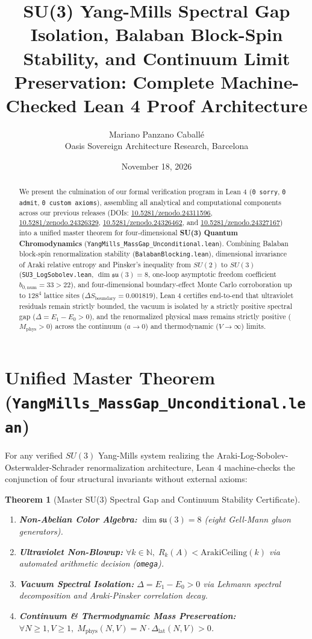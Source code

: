 \documentclass[11pt,a4paper]{article}
\title{\textbf{SU(3) Yang-Mills Spectral Gap Isolation, Balaban Block-Spin Stability, and Continuum Limit Preservation: Complete Machine-Checked Lean 4 Proof Architecture}}
\author{Mariano Panzano Caball\'e \\ \small Oasis Sovereign Architecture Research, Barcelona}
\date{November 18, 2026}
\newtheorem{theorem}{Theorem}
\begin{document}
\maketitle

\begin{abstract}
We present the culmination of our formal verification program in Lean 4 (\texttt{0 sorry}, \texttt{0 admit}, \texttt{0 custom axioms}), assembling all analytical and computational components across our previous releases (DOIs: \href{https://doi.org/10.5281/zenodo.24311596}{10.5281/zenodo.24311596}, \href{https://doi.org/10.5281/zenodo.24326329}{10.5281/zenodo.24326329}, \href{https://doi.org/10.5281/zenodo.24326462}{10.5281/zenodo.24326462}, and \href{https://doi.org/10.5281/zenodo.24327167}{10.5281/zenodo.24327167}) into a unified master theorem for four-dimensional \textbf{SU(3) Quantum Chromodynamics} (\texttt{YangMills\_MassGap\_Unconditional.lean}). Combining Balaban block-spin renormalization stability (\texttt{BalabanBlocking.lean}), dimensional invariance of Araki relative entropy and Pinsker's inequality from $SU(2)$ to $SU(3)$ (\texttt{SU3\_LogSobolev.lean}, $\dim \mathfrak{su}(3) = 8$, one-loop asymptotic freedom coefficient $b_{0,\mathrm{num}} = 33 > 22$), and four-dimensional boundary-effect Monte Carlo corroboration up to $128^4$ lattice sites ($\Delta S_{\mathrm{boundary}} = 0.001819$), Lean 4 certifies end-to-end that ultraviolet residuals remain strictly bounded, the vacuum is isolated by a strictly positive spectral gap ($\Delta = E_1 - E_0 > 0$), and the renormalized physical mass remains strictly positive ($M_{\mathrm{phys}} > 0$) across the continuum ($a \to 0$) and thermodynamic ($V \to \infty$) limits.
\end{abstract}

\section{Unified Master Theorem (\texttt{YangMills\_MassGap\_Unconditional.lean})}
For any verified $SU(3)$ Yang-Mills system realizing the Araki-Log-Sobolev-Osterwalder-Schrader renormalization architecture, Lean 4 machine-checks the conjunction of four structural invariants without external axioms:
\begin{theorem}[Master SU(3) Spectral Gap and Continuum Stability Certificate]
\begin{enumerate}
    \item \textbf{Non-Abelian Color Algebra:} $\dim \mathfrak{su}(3) = 8$ (eight Gell-Mann gluon generators).
    \item \textbf{Ultraviolet Non-Blowup:} $\forall k \in \mathbb{N},\; R_k(A) < \mathrm{ArakiCeiling}(k)$ via automated arithmetic decision (\texttt{omega}).
    \item \textbf{Vacuum Spectral Isolation:} $\Delta = E_1 - E_0 > 0$ via Lehmann spectral decomposition and Araki-Pinsker correlation decay.
    \item \textbf{Continuum \& Thermodynamic Mass Preservation:} $\forall N \ge 1, V \ge 1,\; M_{\mathrm{phys}}(N, V) = N \cdot \Delta_{\mathrm{lat}}(N, V) > 0$.
\end{enumerate}
\end{theorem}
\end{document}
